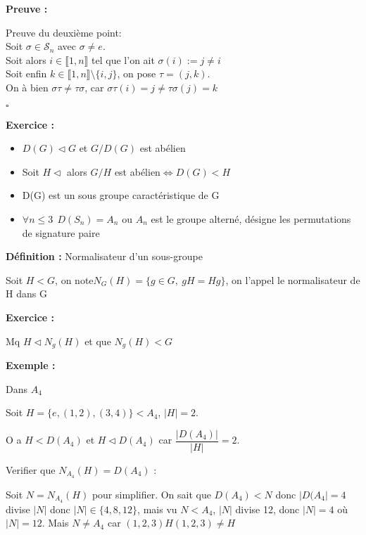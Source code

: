 \documentclass{report}
\renewenvironment{leftbar}{%
  \def\FrameCommand{\vrule width 0.4pt \hspace{10pt}}%
  \MakeFramed {\advance\hsize-\width \FrameRestore}}%
 {\endMakeFramed}%
\newenvironment{definition}[1][]{
    \begin{tcolorbox}[colframe= white]
    \textbf{Définition :} 
    #1 \par
    }
    {\end{tcolorbox}}
\newenvironment{preuve}{\vspace*{0.5cm}
    \begin{leftbar}
    \noindent\textbf{Preuve :}\par}{
    \begin{flushright}
    $\square$
    \end{flushright}
    \end{leftbar}
}
\newenvironment{exemple}{\begin{tcolorbox}[colback=gray!10,colframe= white]
    \textbf{Exemple :}
     \par}
    {\end{tcolorbox}}
\newenvironment{exo}{\begin{tcolorbox}[colframe= white]
    \textbf{Exercice :}
    \par}
    {\end{tcolorbox}}
\newcommand{\sn}{\mathcal{S}_{n}}
\begin{document}
\begin{preuve}
    Preuve du deuxième point:\\
    Soit $\sigma \in \sn$ avec $\sigma \neq e$.\\
    Soit alors $i\in \llbracket 1,n \rrbracket$ tel que l'on ait $\sigma(i):=j\neq i$\\
    Soit enfin $k\in \llbracket 1,n \rrbracket \setminus \{i,j\}$, on pose $\tau = (j,k)$.\\
    On à bien $\sigma\tau\neq\tau\sigma$, car $\sigma\tau(i)=j\neq\tau\sigma(j)=k$
\end{preuve}


\begin{exo}
    \begin{itemize}
        \item $D(G)\vartriangleleft G$ et $G/D(G)$ est abélien
        \item Soit $H \vartriangleleft$ alors $G/H$ est abélien$\Leftrightarrow D(G)<H$
        \item D(G) est un sous groupe caractéristique de G
        \item $\forall n \leq3 ~~D(S_{n})=A_{n}$ ou $A_{n}$ est le groupe alterné, désigne les permutations de signature paire
    \end{itemize}
\end{exo}

\begin{definition}[Normalisateur d'un sous-groupe]
Soit $H<G$, on note$N_{G}(H) = \{g\in G , ~gH=Hg\}$, on l'appel le normalisateur de H dans G
\end{definition}

\begin{exo}
Mq $H\triangleleft N_{g}(H)$ et que $N_{g}(H)<G$
\end{exo}

\begin{exemple}
Dans $A_{4}$ \par
Soit $H =\{ e,(1,2),(3,4) \}<A_{4}$, $|H|=2$.  \par
O a $H<D(A_{4})$ et $H\triangleleft D(A_{4})$ car $\dfrac{|D(A_{4})|}{|H|}=2$.  \par
Verifier que $N_{A_{4}}(H)=D(A_{4})$ :  \par

Soit $N = N_{A_{4}}(H)$ pour simplifier. On sait que $D(A_{4})<N$ donc $|D(A_{4}|=4$ divise $|N|$ donc $|N|\in \{ 4,8,12 \}$, mais vu $N<A_{4}$, $|N|$ divise 12, donc $|N|=4$ où $|N|=12$. Mais $N\neq A_{4}$ car $(1,2,3)H(1,2,3)\neq H$  \par
\end{exemple}
\end{document}
